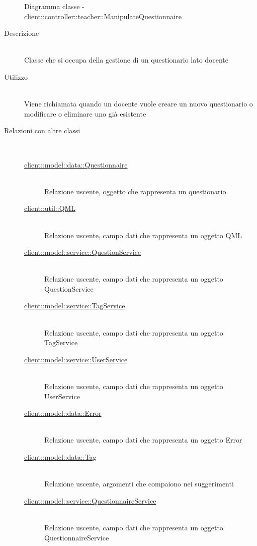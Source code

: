 \begin{figure}[H]
\begin{tikzpicture}
	\end{tikzpicture}
	\caption{Diagramma classe - client::controller::teacher::ManipulateQuestionnaire}
\end{figure}\begin{description}
\item[Descrizione] \hfill \\
Classe che si occupa della gestione di un questionario lato docente
\item[Utilizzo] \hfill \\
Viene richiamata quando un docente vuole creare un nuovo questionario o modificare o eliminare uno già esistente
\item[Relazioni con altre classi] \hfill \\
\vspace{-7mm}
\begin{description}
	\item[\hyperlink{client::model::data::Questionnaire}{client::model::data::Questionnaire}] \hfill \\
	Relazione uscente, oggetto che rappresenta un questionario
	\item[\hyperlink{client::util::QML}{client::util::QML}] \hfill \\
	Relazione uscente, campo dati che rappresenta un oggetto QML
	\item[\hyperlink{client::model::service::QuestionService}{client::model::service::QuestionService}] \hfill \\
	Relazione uscente, campo dati che rappresenta un oggetto QuestionService
	\item[\hyperlink{client::model::service::TagService}{client::model::service::TagService}] \hfill \\
	Relazione uscente, campo dati che rappresenta un oggetto TagService
	\item[\hyperlink{client::model::service::UserService}{client::model::service::UserService}] \hfill \\
	Relazione uscente, campo dati che rappresenta un oggetto UserService
	\item[\hyperlink{client::model::data::Error}{client::model::data::Error}] \hfill \\
	Relazione uscente, campo dati che rappresenta un oggetto Error
	\item[\hyperlink{client::model::data::Tag}{client::model::data::Tag}] \hfill \\
	Relazione uscente, argomenti che compaiono nei suggerimenti
	\item[\hyperlink{client::model::service::QuestionnaireService}{client::model::service::QuestionnaireService}] \hfill \\
	Relazione uscente, campo dati che rappresenta un oggetto QuestionnaireService
\end{description}


\end{description}
